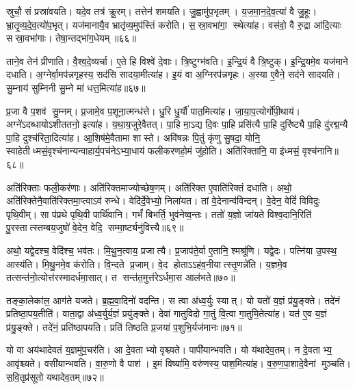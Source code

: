 स्रुचौ॒ सं प्रस्रा॑वयति।
यदे॒व तत्र॑ क्रू॒रम्।
तत्तेन॑ शमयति।
जु॒ह्वामु॑प॒भृतम्।
य॒ज॒मा॒न॒दे॒व॒त्या॑ वै जु॒हूः।
भ्रा॒तृ॒व्य॒दे॒व॒त्यो॑प॒भृत्।
यज॑मानायै॒व भ्रातृ॑व्य॒मुप॑स्तिं करोति।
स॒स्रा॒वभा॑गा॒ स्थेत्या॑ह।
वस॑वो॒ वै रु॒द्रा आ॑दि॒त्याः सस्रा॒वभा॑गाः।
तेषा॒न्तद्भा॑ग॒धेयम्॥६६॥

ताने॒व तेन॑ प्रीणाति।
वै॒श्व॒दे॒व्यर्चा।
ए॒ते हि विश्वे॑ दे॒वाः।
त्रि॒ष्टुग्भ॑वति।
इ॒न्द्रि॒यं वै त्रि॒ष्टुक्।
इ॒न्द्रि॒यमे॒व यज॑माने दधाति।
अ॒ग्नेर्वा॒मप॑न्नगृहस्य॒ सद॑सि सादया॒मीत्या॑ह।
इ॒यं वा अ॒ग्निरप॑न्नगृहः।
अ॒स्या ए॒वैने॒ सद॑ने सादयति।
सु॒म्नाय॑ सुम्निनी सु॒म्ने मा॑ धत्त॒मित्या॑ह॥६७॥

प्र॒जा वै प॒शव॑ सु॒म्नम्।
प्र॒जामे॒व प॒शूना॒त्मन्ध॑त्ते।
धु॒रि धु॒र्यौ॑ पात॒मित्या॑ह।
जा॒या॒प॒त्योर्गो॑पी॒थाय॑।
अग्ने॑ऽदब्धायोऽशीततनो॒ इत्या॑ह।
य॒था॒य॒जुरे॒वैतत्।
पा॒हि मा॒ऽद्य दि॒वः पा॒हि प्रसि॑त्यै पा॒हि दुरि॑ष्ट्यै पा॒हि दु॑रद्म॒न्यै पा॒हि दुश्च॑रिता॒दित्या॑ह।
आ॒शिष॑मे॒वैतामा शास्ते।
अवि॑षन्नः पि॒तुं कृ॑णु सु॒षदा॒ योनि॒ स्वाहेतीध्मसं॒वृश्च॑नान्यन्वाहार्य॒पच॑नेऽभ्या॒धाय॑ फलीकरणहो॒मं जु॑होति।
अति॑रिक्तानि॒ वा इ॑ध्मसं॒ वृश्च॑नानि॥६८॥

अति॑रिक्ताः फली॒कर॑णाः।
अति॑रिक्तमाज्योच्छेष॒णम्।
अति॑रिक्त ए॒वाति॑रिक्तं दधाति।
अथो॒ अति॑रिक्तेनै॒वाति॑रिक्तमा॒प्त्वाऽव॑ रुन्धे।
वेदि॑र्दे॒वेभ्यो॒ निला॑यत।
तां वे॒देनान्व॑विन्दन्।
वे॒देन॒ वेदिं॑ विविदुः पृथि॒वीम्।
सा प॑प्रथे पृथि॒वी पार्थि॑वानि।
गर्भं॑ बिभर्ति॒ भुव॑नेष्व॒न्तः।
ततो॑ य॒ज्ञो जा॑यते विश्व॒दानि॒रिति॑ पु॒रस्तात्स्तम्बय॒जुषो॑ वे॒देन॒ वेदि॒ सम्मा॒र्ष्ट्यनु॑वित्त्यै॥६९॥

अथो॒ यद्वे॒दश्च॒ वेदि॑श्च॒ भव॑तः।
मि॒थु॒न॒त्वाय॒ प्रजात्यै।
प्र॒जाप॑ते॒र्वा ए॒तानि॒ श्मश्रू॑णि।
यद्वे॒दः।
पत्नि॑या उ॒पस्थ॒ आस्य॑ति।
मि॒थु॒नमे॒व क॑रोति।
वि॒न्दते प्र॒जाम्।
वे॒द होताऽऽह॑व॒नीयात्स्तृ॒णन्ने॑ति।
य॒ज्ञमे॒व तत्सन्त॑नो॒त्योत्त॑रस्मादर्धमा॒सात्।
त सन्त॑त॒मुत्त॑रेऽर्धमा॒स आल॑भते॥७०॥

तङ्का॒लेका॑ल॒ आग॑ते यजते।
ब्र॒ह्म॒वा॒दिनो॑ वदन्ति।
स त्वा अ॑ध्व॒र्युः स्यात्।
यो यतो॑ य॒ज्ञं प्र॑यु॒ङ्क्ते।
तदे॑नं प्रतिष्ठा॒पय॒तीति॑।
वाता॒द्वा अ॑ध्व॒र्युर्य॒ज्ञं प्रयु॑ङ्क्ते।
देवा॑ गातुविदो गा॒तुं वि॒त्वा गा॒तुमि॒तेत्या॑ह।
यत॑ ए॒व य॒ज्ञं प्र॑यु॒ङ्क्ते।
तदे॑नं॒ प्रति॑ष्ठापयति।
प्रति॑ तिष्ठति प्र॒जया॑ प॒शुभि॒र्यज॑मानः॥७१॥

यो वा अय॑थादेवतं य॒ज्ञमु॑प॒चर॑ति।
आ दे॒वताभ्यो वृश्च्यते।
पापी॑यान्भवति।
यो य॑थादेव॒तम्।
न दे॒वताभ्य॒ आवृ॑श्च्यते।
वसी॑यान्भवति।
वा॒रु॒णो वै पाश॑।
इ॒मं विष्या॑मि॒ वरु॑णस्य॒ पाश॒मित्या॑ह।
व॒रु॒ण॒पा॒शादे॒वैनां मुञ्चति।
स॒वि॒तृप्र॑सूतो यथादेव॒तम्॥७२॥

